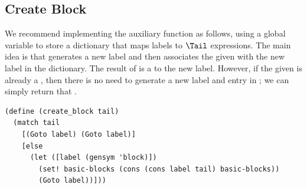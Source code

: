 \documentclass[7x10]{TimesAPriori_MIT}%
\numberwithin{theorem}{chapter}
\numberwithin{definition}{chapter}
\numberwithin{equation}{chapter}
\begin{document}
{\subsection{Create Block}

We recommend implementing the  auxiliary function
as follows, using a global variable  to store a
dictionary that maps labels to $\Tail$ expressions. The main idea is
that  generates a new label and then associates
the given  with the new label in the 
dictionary. The result of  is a  to the
new label. However, if the given  is already a ,
then there is no need to generate a new label and entry in
; we can simply return that .
%
\begin{lstlisting}
(define (create_block tail)
  (match tail
    [(Goto label) (Goto label)]
    [else
      (let ([label (gensym 'block)])
        (set! basic-blocks (cons (cons label tail) basic-blocks))
        (Goto label))]))
\end{lstlisting}


\fi}
\end{document}
